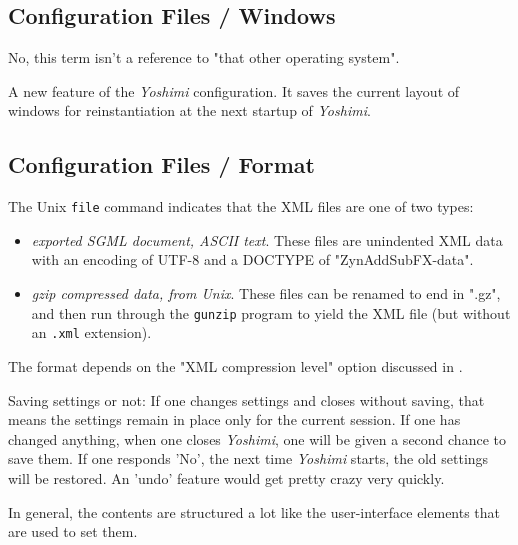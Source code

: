 \subsection{Configuration Files / Windows}
\label{subsec:configuration_windows}

   No, this term isn't a reference to "that other operating system".

   A new feature of the \textsl{Yoshimi} configuration.  It saves the current
   layout of windows for reinstantiation at the next startup of
   \textsl{Yoshimi}.

\subsection{Configuration Files / Format}
\label{subsec:configuration_file_format}

   The Unix \texttt{file} command indicates that the XML files are one of
   two types:

   \begin{itemize}
      \item \textsl{exported SGML document, ASCII text}.
         These files are unindented XML data with an encoding of UTF-8 and
         a DOCTYPE of "ZynAddSubFX-data".
      \item \textsl{gzip compressed data, from Unix}.
         These files can be renamed to end in ".gz", and then run through
         the \texttt{gunzip} program to yield the XML file (but without an
         \texttt{.xml} extension).
   \end{itemize}

   The format depends on the "XML compression level" option discussed in
   .

   Saving settings or not:
   If one changes settings and closes without saving, that means the settings
   remain in place only for the current session. If one has changed anything,
   when one closes \textsl{Yoshimi}, one will be given a second chance to
   save them. If one responds 'No',  the next time \textsl{Yoshimi} starts,
   the old settings will be restored.  An 'undo' feature would get pretty
   crazy very quickly.

   In general, the contents are structured a lot like the
   user-interface elements that are used to set them.

